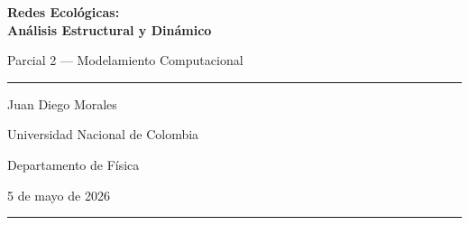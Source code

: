 \documentclass[12pt, a4paper]{article}
\begin{document}
\begin{titlepage}
\centering
\vspace*{1cm}
{\LARGE\bfseries\color{azul} Redes Ecológicas:\\ Análisis Estructural y Dinámico\par}
\vspace{0.4cm}
{\large Parcial 2 — Modelamiento Computacional\par}
\vspace{1.5cm}

\rule{0.7\textwidth}{1pt}
\vspace{0.4cm}

{\large Juan Diego Morales\par}
{\normalsize Universidad Nacional de Colombia\par}
{\normalsize Departamento de Física\par}
\vspace{0.4cm}
{\normalsize 5 de mayo de 2026\par}

\vspace{1.5cm}
\rule{0.7\textwidth}{0.5pt}
\vspace{1cm}

\begin{abstract}
\noindent
Se presenta un análisis computacional completo de redes ecológicas tipo trama trófica
(\textit{food web}), abarcando desde la representación matricial de la topología
hasta la integración numérica de ecuaciones de Lotka-Volterra generalizadas.
Para redes sintéticas generadas mediante el modelo de nicho de Williams \& Martinez
(2000) con $S = 5$, $30$ y $50$ especies y conectancia $C \approx 0.13$--$0.28$, se
cuantifican métricas estructurales (conectancia, diámetro, modularidad, asortatividad),
centralidades nodales, niveles tróficos, estabilidad lineal vía análisis espectral de la
matriz comunitaria, cascadas de extinción y descomposición Bow-Tie.
Se demuestra que la estabilidad observada en redes estructuradas contradice la
predicción del criterio de May para matrices aleatorias, evidenciando que la
arquitectura no aleatoria de las tramas tróficas favorece la coexistencia dinámica.
La integración GLV con RK45 confirma la resiliencia ante perturbaciones de pulso
en redes estables.
\end{abstract}
\end{titlepage}

\tableofcontents
\newpage
\end{document}
